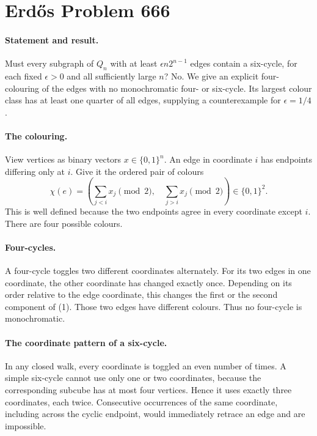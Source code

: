 \section*{Erd\H{o}s Problem 666}

\paragraph{Statement and result.}
Must every subgraph of \(Q_n\) with at least \(\epsilon n2^{n-1}\) edges contain a six-cycle, for each fixed \(\epsilon>0\) and all sufficiently large \(n\)? No. We give an explicit four-colouring of the edges with no monochromatic four- or six-cycle. Its largest colour class has at least one quarter of all edges, supplying a counterexample for \(\epsilon=1/4\).

\paragraph{The colouring.}
View vertices as binary vectors \(x\in\{0,1\}^n\). An edge in coordinate \(i\) has endpoints differing only at \(i\). Give it the ordered pair of colours
\[
 \chi(e)=\left(\sum_{j<i}x_j\pmod2,\quad
                    \sum_{j>i}x_j\pmod2\right)\in\{0,1\}^2. \tag{1}
\]
This is well defined because the two endpoints agree in every coordinate except \(i\). There are four possible colours.

\paragraph{Four-cycles.}
A four-cycle toggles two different coordinates alternately. For its two edges in one coordinate, the other coordinate has changed exactly once. Depending on its order relative to the edge coordinate, this changes the first or the second component of (1). Those two edges have different colours. Thus no four-cycle is monochromatic.

\paragraph{The coordinate pattern of a six-cycle.}
In any closed walk, every coordinate is toggled an even number of times. A simple six-cycle cannot use only one or two coordinates, because the corresponding subcube has at most four vertices. Hence it uses exactly three coordinates, each twice. Consecutive occurrences of the same coordinate, including across the cyclic endpoint, would immediately retrace an edge and are impossible.

